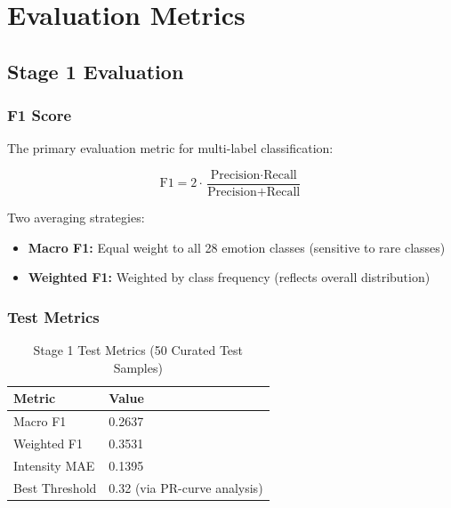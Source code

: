 \documentclass[12pt, a4paper]{report}
\begin{document}
\chapter{Evaluation Metrics}

\section{Stage 1 Evaluation}

\subsection{F1 Score}

The primary evaluation metric for multi-label classification:

\begin{equation}
    \text{F1} = 2 \cdot \frac{\text{Precision} \cdot \text{Recall}}{\text{Precision} + \text{Recall}}
\end{equation}

Two averaging strategies:
\begin{itemize}
    \item \textbf{Macro F1:} Equal weight to all 28 emotion classes (sensitive to rare classes)
    \item \textbf{Weighted F1:} Weighted by class frequency (reflects overall distribution)
\end{itemize}

\subsection{Test Metrics}

\begin{table}[H]
    \centering
    \caption{Stage 1 Test Metrics (50 Curated Test Samples)}
    \label{tab:test_metrics}
    \begin{tabular}{@{}ll@{}}
        \toprule
        \textbf{Metric} & \textbf{Value} \\
        \midrule
        Macro F1 & 0.2637 \\
        Weighted F1 & 0.3531 \\
        Intensity MAE & 0.1395 \\
        Best Threshold & 0.32 (via PR-curve analysis) \\
        \bottomrule
    \end{tabular}
\end{table}
\end{document}
